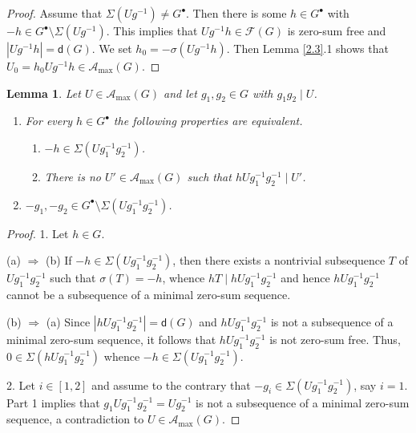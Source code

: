 \documentclass[a4paper, 10pt]{amsart}
\theoremstyle{plain}
\newtheorem{lemma}[theorem]{\bf Lemma}
\theoremstyle{definition}
\numberwithin{equation}{section}
\begin{document}
\begin{proof}
	Assume that $\Sigma (Ug^{-1})\ne G^{\bullet}$. Then there is some $h \in G^{\bullet}$ with $-h\in G^{\bullet}\setminus \Sigma (Ug^{-1})$. This implies that $Ug^{-1}h\in \mathcal F (G)$ is zero-sum free and  $|Ug^{-1}h|=\mathsf d (G)$. We set $h_0 = - \sigma ( Ug^{-1}h )$. Then Lemma  \ref{2.3}.1 shows that $U_0 = h_0 U g^{-1}h \in \mathcal A_{\max} (G)$.
\end{proof}


\begin{lemma}\label{2.5}
Let $U\in \mathcal A_{\max}(G)$ and let $g_1, g_2 \in G$ with $g_1g_2\mid U$. 
\begin{enumerate}
\item For every $h\in G^{\bullet}$ the following properties are equivalent. 
      \begin{enumerate}
	  \item[(a)] $-h\in \Sigma(Ug_1^{-1}g_2^{-1})$. 

      \item[(b)] There is no  $U'\in \mathcal A_{\max}(G)$ such that $hUg_1^{-1}g_2^{-1}\mid U'$.
	  \end{enumerate}

\item $-g_1,-g_2\in G^{\bullet}\setminus \Sigma(Ug_1^{-1}g_2^{-1})$.
\end{enumerate}
\end{lemma}

\begin{proof}
1.	Let $h \in G$.

(a) $\Longrightarrow$ (b)  If  $-h\in \Sigma(Ug_1^{-1}g_2^{-1})$, then there exists a nontrivial subsequence $T$ of $ Ug_1^{-1}g_2^{-1}$ such that $\sigma(T)=-h$, whence $hT\mid hUg_1^{-1}g_2^{-1}$ and hence $hUg_1^{-1}g_2^{-1}$ cannot be a subsequence of  a minimal zero-sum sequence.

(b) $\Longrightarrow$ (a) 
Since $|hUg_1^{-1}g_2^{-1}|=\mathsf d (G)$ and $hUg_1^{-1}g_2^{-1}$ is not a subsequence of a minimal zero-sum sequence, it follows that  $hUg_1^{-1}g_2^{-1}$ is not zero-sum free. Thus,  $0\in \Sigma(hUg_1^{-1}g_2^{-1})$ whence $-h\in \Sigma(Ug_1^{-1}g_2^{-1})$. 
	
2. Let $i \in [1,2]$ and
assume to the contrary that $-g_i\in \Sigma(Ug_1^{-1}g_2^{-1})$, say $i=1$. Part 1 implies that $g_1Ug_1^{-1}g_2^{-1}= Ug_2^{-1}$ is not a subsequence of a minimal zero-sum sequence, a contradiction to $U\in \mathcal A_{\max}(G)$.
\end{proof}
\end{document}
